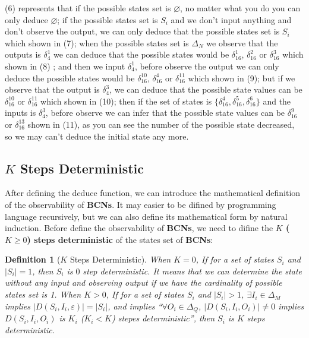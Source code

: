 \documentclass[letterpaper, 10 pt, conference]{ieeeconf}  %
\newtheorem{definition}{Definition}
\begin{document}
(6) represents that if the possible states set is $\varnothing$, no matter what you do you can only deduce $\varnothing$; if the possible states set is $S_i$ and we don't input anything and don't observe the output, we can only deduce that the possible states set is $S_i$ which shown in (7); when the possible states set is $\Delta_N$ we observe that the outputs is $\delta_4^1$ we can deduce that the possible states would be $\delta_{16}^1$, $\delta_{16}^2$ or  $\delta_{16}^3$ which shown in (8) ; and then we input $\delta_4^1$, before observe the output we can only deduce the possible states would be   $\delta_{16}^{10}$, $\delta_{16}^4$ or  $\delta_{16}^{11}$ which shown in (9); but if we observe that the output is $\delta_4^3$, we can deduce that the possible state values can be $\delta_{16}^{10}$ or  $\delta_{16}^{11}$ which shown in (10); then if the set of states is $\{\delta_{16}^4,\delta_{16}^5,\delta_{16}^6\}$ and the inputs is $\delta_4^3$, before observe we can infer that the possible state values can be $\delta_{16}^9$ or  $\delta_{16}^{13}$ shown in (11), as you can see the number of the possible state decreased, so we may can't deduce the initial state any more. 

\subsection{$K$ Steps Deterministic}
After defining the deduce function, we can introduce the mathematical definition of the observability of {\bf BCNs}. It may easier to be difined by programming language recursively, but we can also define its mathematical form by natural induction. Before define the observability of {\bf BCNs}, we need to difine the  {\bf  $K$ ($K\ge0$) steps deterministic} of the states set of {\bf BCNs}:\\
\begin{definition}[$K$ Steps Deterministic] 
When $K=0$, 
 If for a set of states $S_i$ and $|S_i|=1$, then $S_i$ is $0$ step deterministic. It means that we can determine the state without any input and observing output if we have the cardinality of possible states set is 1. When $K>0$, 
 If for a set of states $S_i$ and $|S_i|>1$, $\exists I_i \in \Delta_M$ implies $|D\left(S_i,I_i,\varepsilon\right)|=|S_i|$, and implies ``$\forall O_i\in \Delta_Q$, $|D\left(S_i,I_i,O_i\right)|\neq 0$ implies $D\left(S_i,I_i,O_i\right)$ is $K_i$ ($K_i<K$) stepes deterministic'', then $S_i$ is $K$ steps deterministic.
\end{definition}
\end{document}
